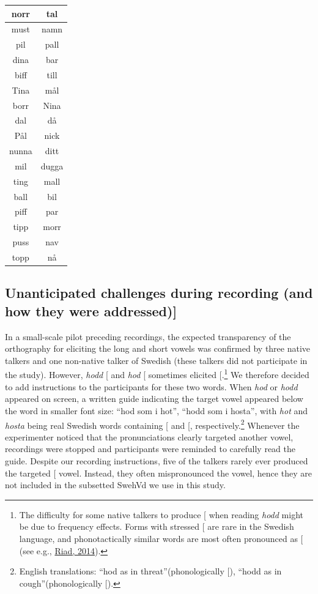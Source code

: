 \documentclass[utf8]{frontiers_suppmat} %
\begin{document}
\begin{table}
\begin{tabular}[t]{c|c}
\hline
norr&tal\\
\hline
must&namn\\
\hline
pil&pall\\
\hline
dina&bar\\
\hline
biff&till\\
\hline
Tina&mål\\
\hline
borr&Nina\\
\hline
dal&då\\
\hline
Pål&nick\\
\hline
nunna&ditt\\
\hline
mil&dugga\\
\hline
ting&mall\\
\hline
ball&bil\\
\hline
piff&par\\
\hline
tipp&morr\\
\hline
puss&nav\\
\hline
topp&nå\\
\end{tabular}
\end{table}

\hypertarget{sec:challenges}{%
\subsection{Unanticipated challenges during recording (and how they were addressed){]}}\label{sec:challenges}}

In a small-scale pilot preceding recordings, the expected transparency of the orthography for eliciting the long and short vowels was confirmed by three native talkers and one non-native talker of Swedish (these talkers did not participate in the study). However, \emph{hodd} {[}\ipatext{ʊ}{]} and \emph{hod} {[}\ipatext{uː}{]} sometimes elicited {[}\ipatext{ɔ}{]}.\footnote{The difficulty for some native talkers to produce {[}\ipatext{ʊ}{]} when reading \emph{hodd} might be due to frequency effects. Forms with stressed {[}\ipatext{ʊ}{]} are rare in the Swedish language, and phonotactically similar words are most often pronounced as {[}\ipatext{ɔ}{]} (see e.g., \protect\hyperlink{ref-riad2014}{Riad, 2014}).} We therefore decided to add instructions to the participants for these two words. When \emph{hod} or \emph{hodd} appeared on screen, a written guide indicating the target vowel appeared below the word in smaller font size: ``hod som i hot'', ``hodd som i hosta'', with \emph{hot} and \emph{hosta} being real Swedish words containing {[}\ipatext{uː}{]} and {[}\ipatext{ʊ}{]}, respectively.\footnote{English translations: ``hod as in threat''(phonologically {[}\ipatext{uː}{]}), ``hodd as in cough''(phonologically {[}\ipatext{ʊ}{]}).} Whenever the experimenter noticed that the pronunciations clearly targeted another vowel, recordings were stopped and participants were reminded to carefully read the guide. Despite our recording instructions, five of the talkers rarely ever produced the targeted {[}\ipatext{ʊ}{]} vowel. Instead, they often mispronounced the vowel, hence they are not included in the subsetted SwehVd we use in this study.
\end{document}
